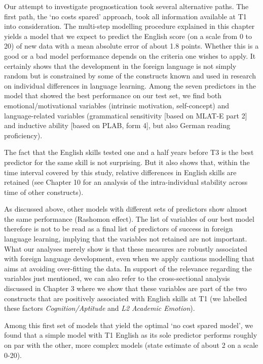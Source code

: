 \documentclass[output=paper]{langsci/langscibook}
\begin{document}
Our attempt to investigate prognostication took several alternative paths. The first path, the ‘no costs spared’ approach, took all information available at T1 into consideration. The multi-step modelling procedure explained in this chapter yields a model that we expect to predict the English score (on a scale from 0 to 20) of new data with a mean absolute error of about 1.8 points. Whether this is a good or a bad model performance depends on the criteria one wishes to apply. It certainly shows that the development in the foreign language is not simply random but is constrained by some of the constructs known and used in research on individual differences in language learning. Among the seven predictors in the model that showed the best performance on our test set, we find both emotional/motivational variables (intrinsic motivation, self-concept) and language-related variables (grammatical sensitivity [based on MLAT-E part 2] and inductive ability [based on PLAB, form 4], but also German reading proficiency). 

The fact that the English skills tested one and a half years before T3 is the best predictor for the same skill is not surprising. But it also shows that, within the time interval covered by this study, relative differences in English skills are retained (see Chapter 10 for an analysis of the intra-individual stability across time of other constructs). 

As discussed above, other models with different sets of predictors show almost the same performance (Rashomon effect). The list of variables of our best model therefore is not to be read as a final list of predictors of success in foreign language learning, implying that the variables not retained are not important. What our analyses merely show is that these measures are robustly associated with foreign language development, even when we apply cautious modelling that aims at avoiding over-fitting the data. In support of the relevance regarding the variables just mentioned, we can also refer to the cross-sectional analysis discussed in Chapter 3 where we show that these variables are part of the two constructs that are positively associated with English skills at T1 (we labelled these factors \textit{Cognition/Aptitude} and \textit{L2} \textit{Academic Emotion}).

Among this first set of models that yield the optimal ‘no cost spared model’, we found that a simple model with T1 English as its sole predictor performs roughly on par with the other, more complex models (state estimate of about 2 on a scale 0-20). 
\end{document}
